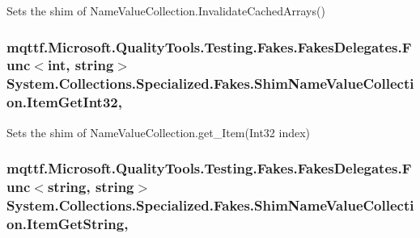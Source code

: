 Sets the shim of Name\-Value\-Collection.\-Invalidate\-Cached\-Arrays()

\hypertarget{class_system_1_1_collections_1_1_specialized_1_1_fakes_1_1_shim_name_value_collection_a494ff3556795999db78086c4a188471c}{
\subsubsection[{Item\-Get\-Int32}]{\setlength{\rightskip}{0pt plus 5cm}mqttf.\-Microsoft.\-Quality\-Tools.\-Testing.\-Fakes.\-Fakes\-Delegates.\-Func$<$int, string$>$ System.\-Collections.\-Specialized.\-Fakes.\-Shim\-Name\-Value\-Collection.\-Item\-Get\-Int32\hspace{0.3cm}{\ttfamily [get]}, {\ttfamily [set]}}}\label{class_system_1_1_collections_1_1_specialized_1_1_fakes_1_1_shim_name_value_collection_a494ff3556795999db78086c4a188471c}


Sets the shim of Name\-Value\-Collection.\-get\-\_\-\-Item(\-Int32 index)

\hypertarget{class_system_1_1_collections_1_1_specialized_1_1_fakes_1_1_shim_name_value_collection_ada6cd08cbdb23009d9e8f2468682b976}{
\subsubsection[{Item\-Get\-String}]{\setlength{\rightskip}{0pt plus 5cm}mqttf.\-Microsoft.\-Quality\-Tools.\-Testing.\-Fakes.\-Fakes\-Delegates.\-Func$<$string, string$>$ System.\-Collections.\-Specialized.\-Fakes.\-Shim\-Name\-Value\-Collection.\-Item\-Get\-String\hspace{0.3cm}{\ttfamily [get]}, {\ttfamily [set]}}}\label{class_system_1_1_collections_1_1_specialized_1_1_fakes_1_1_shim_name_value_collection_ada6cd08cbdb23009d9e8f2468682b976}


